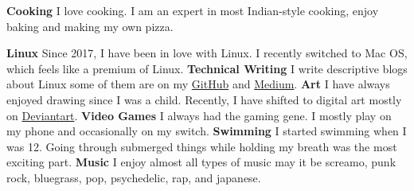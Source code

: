 



\begin{cvskills}
  \cvskill
    {\textbf{Cooking}} %
    {I love cooking. I am an expert in most Indian-style cooking, enjoy baking and making my own pizza.} %

  \cvskill
    {\textbf{Linux}} %
    {Since 2017, I have been in love with Linux. I recently switched to Mac OS, which feels like a premium of Linux.} %
  \cvskill
    {\textbf{Technical Writing}} %
    {I write descriptive blogs about Linux some of them are on my \href{https://github.com/themagicalmammal/howtodebuntu}{GitHub} and \href{https://medium.com/@d19cyber}{Medium}.} %
  \cvskill
    {\textbf{Art}} %
    {I have always enjoyed drawing since I was a child. Recently, I have shifted to digital art mostly on \href{https://www.deviantart.com/themagicalmammal}{Deviantart}.} %
  \cvskill
    {\textbf{Video Games}} %
    {I always had the gaming gene. I mostly play on my phone and occasionally on my switch.} %
  \cvskill
    {\textbf{Swimming}} %
    {I started swimming when I was 12. Going through submerged things while holding my breath was the most exciting part.} %
  \cvskill
    {\textbf{Music}} %
    {I enjoy almost all types of music may it be screamo, punk rock, bluegrass, pop, psychedelic, rap, and japanese. } %

\end{cvskills}